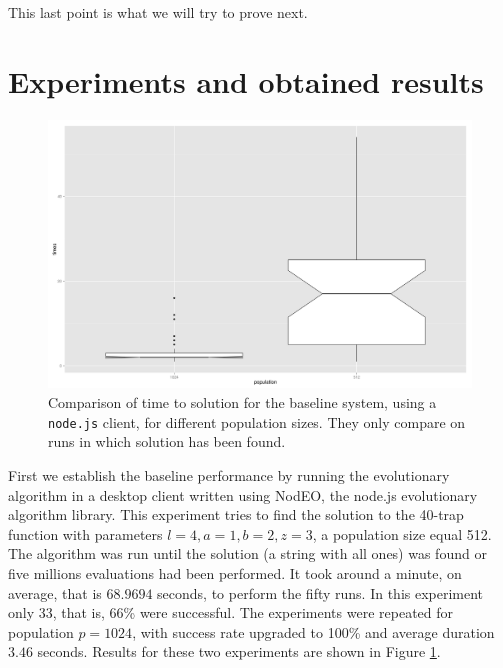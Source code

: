 \documentclass[journal,onecolumn]{IEEEtran}
\begin{document}
This last point is what we will try to prove next.

\section{Experiments and obtained results}
\label{sec:experiments}

\begin{figure}[!t]
\centering
\includegraphics[width=12cm]{img/baseline-times.png}
\caption{Comparison of time to solution for the baseline system, using a {\tt
    node.js} client, for different population sizes. They only compare on
runs in which solution has been found.}
\label{fig:baseline}
\end{figure}
First we establish the baseline performance by running the
evolutionary algorithm in a desktop client written using NodEO, 
the node.js evolutionary algorithm library. This experiment tries to 
find the solution to the 40-trap function with parameters $l=4, a=1,
b=2, z=3$, a population size equal 512. The algorithm was run until the solution (a string with all
ones) was found or five millions evaluations had been performed. It
took around a minute, on average, that is $68.9694$ seconds, to
perform the fifty runs. In this experiment only 33, that is, 66\% were
successful. The experiments were repeated for population $p=1024$,
with success rate upgraded to 100\% and average duration $3.46$
seconds. Results for these two experiments 
are shown in Figure \ref{fig:baseline}.
\end{document}
